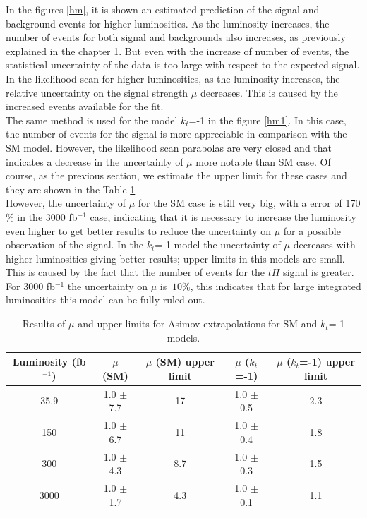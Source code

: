 	In the figures \ref{hm}, it is shown an estimated prediction of the signal and background events for higher luminosities. As the luminosity increases, the number of events for both signal and backgrounds also increases, as previously explained in the chapter 1. But even with the increase of number of events, the statistical uncertainty of the data is too large with respect to the expected signal.  In the likelihood scan for higher luminosities, as the luminosity increases, the relative uncertainty on the signal strength $\mu$ decreases. This is caused by the increased events available for the fit. \\
	
	The same method is used for the model $k_t$=-1 in the figure \ref{hm1}. In this case, the number of events for the signal is more appreciable in comparison with the SM model. However, the likelihood scan parabolas are very closed and that indicates a decrease in the uncertainty of $\mu$ more notable than SM case. 
	Of course, as the previous section, we estimate the upper limit for these cases and they are shown in the Table \ref{upper}\\
	
	However, the uncertainty of $\mu$ for the SM case is still very big, with a error of 170$\%$ in the 3000 fb$^{-1}$ case, indicating that it is necessary to increase the luminosity even higher to get better results to reduce the uncertainty on $\mu$ for a possible observation of the signal. 
	In the $k_t$=-1 model the uncertainty of $\mu$ decreases with higher luminosities  giving better results; upper limits in this models are small. This is caused by the fact that the number of events for the $tH$ signal is greater. For 3000 fb$^{-1}$ the uncertainty on $\mu$ is $~10\%$, this indicates that for large integrated luminosities this model can be fully ruled out.

	\begin{table}[ht!]
		\caption{Results of $\mu$ and upper limits for Asimov extrapolations for SM and $k_t$=-1 models.}
		\begin{tabular}{|c|c|c|c|c|}
			\hline
			Luminosity (fb$^{-1}$)	&$\mu$ (SM) &$\mu$ (SM) upper limit    &   $\mu$ ($k_t$=-1) &$\mu$ ($k_t$=-1) upper limit   \\
			\hline
			35.9 & 1.0 $\pm$  7.7 &  17  & 1.0 $\pm$  0.5 & 2.3  \\
			\hline
			150& 1.0 $\pm$  6.7& 11  &  1.0 $\pm$  0.4 &1.8\\
			\hline
			300&1.0 $\pm$  4.3 &8.7 &  1.0 $\pm$  0.3 &1.5 \\
			\hline
			3000&1.0 $\pm$  1.7 & 4.3  &	 1.0 $\pm$  0.1 & 1.1\\
			\hline
		\end{tabular}
		\label{upper}
	\end{table}
	
